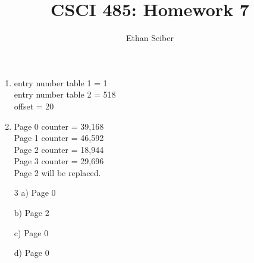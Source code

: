 \documentclass[12pt]{article}
\author{Ethan Seiber}
\title{CSCI 485: Homework 7}
\begin{document}
\maketitle

\begin{enumerate}
	\item
		entry number table 1 = 1\\
		entry number table 2 = 518\\
		offset = 20
	
	\item Page 0 counter = 39,168\\
	Page 1 counter = 46,592\\
	Page 2 counter = 18,944\\
	Page 3 counter = 29,696\\
	
	Page 2 will be replaced.
	\item[3 a)] Page 0
	\item[b)] Page 2
	\item[c)] Page 0
	\item[d)] Page 0
		
		
\end{enumerate}
\end{document}

